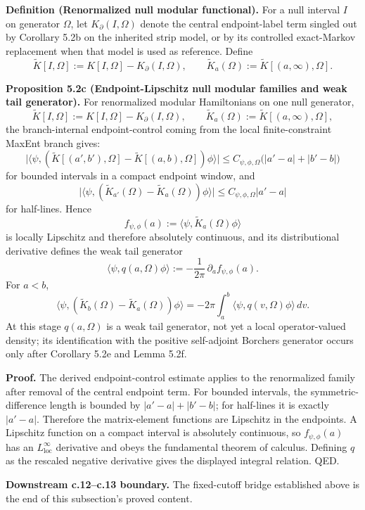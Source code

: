 \textbf{Definition (Renormalized null modular functional).} For a null interval \(I\) on generator \(\Omega\), let \(K_\partial(I,\Omega)\) denote the central endpoint-label term singled out by Corollary 5.2b on the inherited strip model, or by its controlled exact-Markov replacement when that model is used as reference. Define
\[
\widetilde K[I,\Omega]
:=
K[I,\Omega]-K_\partial(I,\Omega),
\qquad
\widetilde K_a(\Omega):=\widetilde K[(a,\infty),\Omega].
\]

\textbf{Proposition 5.2c (Endpoint-Lipschitz null modular families and weak tail generator).} For renormalized modular Hamiltonians on one null generator,
\[
\widetilde K[I,\Omega]
:=
K[I,\Omega]-K_\partial(I,\Omega),
\qquad
\widetilde K_a(\Omega):=\widetilde K[(a,\infty),\Omega],
\]
the branch-internal endpoint-control coming from the local finite-constraint MaxEnt branch gives:
\[
\bigl|
\langle\psi,(\widetilde K[(a',b'),\Omega]-\widetilde K[(a,b),\Omega])\phi\rangle
\bigr|
\le
C_{\psi,\phi,\Omega}\bigl(|a'-a|+|b'-b|\bigr)
\]
for bounded intervals in a compact endpoint window, and
\[
\bigl|
\langle\psi,(\widetilde K_{a'}(\Omega)-\widetilde K_a(\Omega))\phi\rangle
\bigr|
\le
C_{\psi,\phi,\Omega}|a'-a|
\]
for half-lines. Hence
\[
f_{\psi,\phi}(a):=\langle\psi,\widetilde K_a(\Omega)\phi\rangle
\]
is locally Lipschitz and therefore absolutely continuous, and its distributional derivative defines the weak tail generator
\[
\langle\psi,q(a,\Omega)\phi\rangle
:=
-\frac{1}{2\pi}\,\partial_a f_{\psi,\phi}(a).
\]
For \(a<b\),
\[
\langle\psi,(\widetilde K_b(\Omega)-\widetilde K_a(\Omega))\phi\rangle
=
-2\pi\int_a^b \langle\psi,q(v,\Omega)\phi\rangle\,dv.
\]
At this stage \(q(a,\Omega)\) is a weak tail generator, not yet a local operator-valued density; its identification with the positive self-adjoint Borchers generator occurs only after Corollary 5.2e and Lemma 5.2f.

\textbf{Proof.} The derived endpoint-control estimate applies to the renormalized family after removal of the central endpoint term. For bounded intervals, the symmetric-difference length is bounded by \(|a'-a|+|b'-b|\); for half-lines it is exactly \(|a'-a|\). Therefore the matrix-element functions are Lipschitz in the endpoints. A Lipschitz function on a compact interval is absolutely continuous, so \(f_{\psi,\phi}(a)\) has an \(L^\infty_{\mathrm{loc}}\) derivative and obeys the fundamental theorem of calculus. Defining \(q\) as the rescaled negative derivative gives the displayed integral relation. QED.

\textbf{Downstream c.12--c.13 boundary.} The fixed-cutoff bridge established above is the end of this subsection's proved content.

